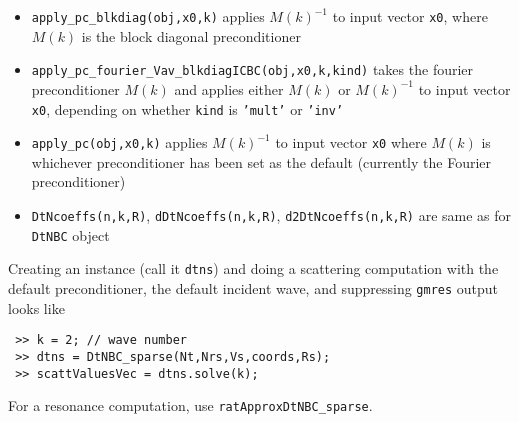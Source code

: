 \begin{description}
\begin{itemize}
          {\tt x0}
    \item {\tt apply\_pc\_blkdiag(obj,x0,k)} applies $M(k)^{-1}$ to
          input vector {\tt x0}, where $M(k)$ is the block diagonal
          preconditioner
    \item {\tt apply\_pc\_fourier\_Vav\_blkdiagICBC(obj,x0,k,kind)}
          takes the fourier preconditioner $M(k)$ and applies either
          $M(k)$ or $M(k)^{-1}$ to input vector {\tt x0}, depending
          on whether {\tt kind} is {\tt 'mult'} or {\tt 'inv'}
    \item {\tt apply\_pc(obj,x0,k)} applies $M(k)^{-1}$ to input
          vector {\tt x0} where $M(k)$ is whichever preconditioner
          has been set as the default (currently the Fourier preconditioner)
    \item {\tt DtNcoeffs(n,k,R)}, {\tt dDtNcoeffs(n,k,R)}, 
          {\tt d2DtNcoeffs(n,k,R)} are same as for {\tt DtNBC} object
   \end{itemize}
\end{description}


Creating an instance (call it {\tt dtns}) 
and doing a scattering computation with the default
preconditioner, the default incident wave, and suppressing
{\tt gmres} output looks like
\begin{verbatim}
 >> k = 2; // wave number
 >> dtns = DtNBC_sparse(Nt,Nrs,Vs,coords,Rs);
 >> scattValuesVec = dtns.solve(k);
\end{verbatim}
For a resonance computation, use {\tt ratApproxDtNBC\_sparse}.




